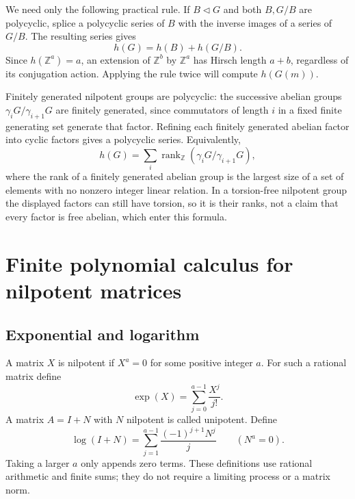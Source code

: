 \documentclass[11pt]{article}
\numberwithin{equation}{section}
\theoremstyle{definition}
\theoremstyle{remark}
\newcommand{\Z}{\mathbb Z}
\newcommand{\rk}{\operatorname{rank}}
\begin{document}
We need only the following practical rule. If $B\triangleleft G$ and both $B,G/B$ are polycyclic, splice a polycyclic series of $B$ with the inverse images of a series of $G/B$. The resulting series gives
\begin{equation}\label{eq:hirschadditivity}
h(G)=h(B)+h(G/B).
\end{equation}
Since $h(\Z^a)=a$, an extension of $\Z^b$ by $\Z^a$ has Hirsch length $a+b$, regardless of its conjugation action. Applying the rule twice will compute $h(G(m))$.

Finitely generated nilpotent groups are polycyclic: the successive abelian groups $\gamma_iG/\gamma_{i+1}G$ are finitely generated, since commutators of length $i$ in a fixed finite generating set generate that factor. Refining each finitely generated abelian factor into cyclic factors gives a polycyclic series. Equivalently,
\[
h(G)=\sum_i\rk_{\Z}(\gamma_iG/\gamma_{i+1}G),
\]
where the rank of a finitely generated abelian group is the largest size of a set of elements with no nonzero integer linear relation. In a torsion-free nilpotent group the displayed factors can still have torsion, so it is their ranks, not a claim that every factor is free abelian, which enter this formula.

\section{Finite polynomial calculus for nilpotent matrices}\label{sec:polynomials}
\subsection{Exponential and logarithm}
A matrix $X$ is nilpotent if $X^a=0$ for some positive integer $a$. For such a rational matrix define
\[
\exp(X)=\sum_{j=0}^{a-1}\frac{X^j}{j!}.
\]
A matrix $A=I+N$ with $N$ nilpotent is called unipotent. Define
\[
\log(I+N)=\sum_{j=1}^{a-1}\frac{(-1)^{j+1}N^j}{j}
\qquad(N^a=0).
\]
Taking a larger $a$ only appends zero terms. These definitions use rational arithmetic and finite sums; they do not require a limiting process or a matrix norm.
\end{document}
